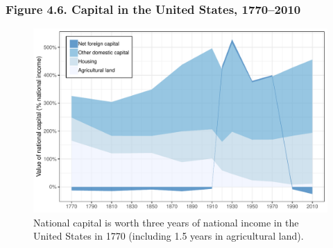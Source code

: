 \documentclass[t]{beamer}\usepackage[]{graphicx}\usepackage[]{color}
\newenvironment{knitrout}{}{} %
\begin{document}
\begin{frame}[label=Figure_4_6]
\frametitle{Figure 4.6. Capital in the United States, 1770--2010}
\begin{figure}[t]
\begin{minipage}[b]{\textwidth}
\centering
\begin{knitrout}\footnotesize
{}\color{fgcolor}

{\centering \includegraphics[width=1\linewidth]{figures/color/Figure_4_6} 

}



\end{knitrout}
\caption{National capital is worth three years of national income in the United States in 1770 (including 1.5 years in agricultural land).}
\end{minipage}
\end{figure}
\end{frame}
\end{document}
